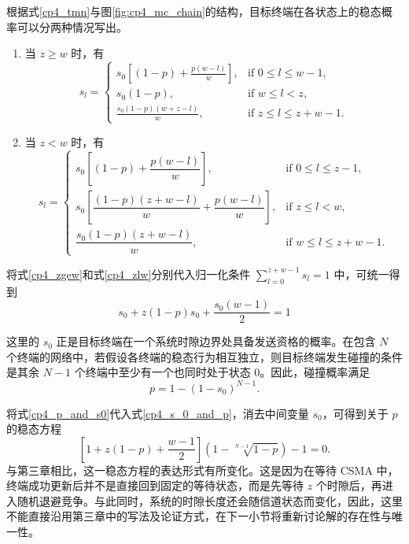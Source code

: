 根据式\eqref{cp4_tmn}与图\ref{fig:cp4_mc_chain}的结构，目标终端在各状态上的稳态概率可以分两种情况写出。
\begin{enumerate}[wide]
    \item 当 $z\ge w$ 时，有
    \begin{equation}\label{cp4_zgew}
        s_l =
\begin{cases}
s_0 \left[ (1 - p) + \frac{p(w-l)}{w} \right], & \text{if } 0 \le l \le w - 1, \\
s_0 (1 - p), & \text{if } w \le l < z, \\
\frac{s_0 (1-p)(w+z-l)}{w}, & \text{if } z \le l \le z + w - 1.
\end{cases}
    \end{equation}

    \item 当 $z<w$ 时，有
    \begin{equation}\label{cp4_zlw}
        s_l =
\begin{cases}
s_0 \left[ (1 - p) + \dfrac{p(w-l)}{w} \right], & \text{if } 0 \le l \le z - 1, \\
s_0 \left[ \dfrac{(1-p)(z+w-l)}{w} + \dfrac{p(w-l)}{w} \right], & \text{if } z \le l < w, \\
\dfrac{s_0 (1-p)(z+w-l)}{w}, & \text{if } w \le l \le z + w - 1.
\end{cases}
    \end{equation}
\end{enumerate}

将式\eqref{cp4_zgew}和式\eqref{cp4_zlw}分别代入归一化条件 $\sum_{l=0}^{z+w-1}s_l=1$ 中，可统一得到
\begin{equation}\label{cp4_s_0_and_p}
    s_0+z(1-p)s_0+\frac{s_0(w-1)}{2}=1
\end{equation}

这里的 $s_0$ 正是目标终端在一个系统时隙边界处具备发送资格的概率。在包含 $N$ 个终端的网络中，若假设各终端的稳态行为相互独立，则目标终端发生碰撞的条件是其余 $N-1$ 个终端中至少有一个也同时处于状态 0。因此，碰撞概率满足
\begin{equation}\label{cp4_p_and_s0}
    p=1-(1-s_0)^{N-1}.
\end{equation}

将式\eqref{cp4_p_and_s0}代入式\eqref{cp4_s_0_and_p}，消去中间变量 $s_0$，可得到关于 $p$ 的稳态方程
\begin{equation}\label{cp4_ziqiafangcheng_p}
    \left[ 1 + z(1-p) + \frac{w-1}{2} \right] \left( 1 -\sqrt[N -1]{1-p} \right) - 1=0.
\end{equation}
与第三章相比，这一稳态方程的表达形式有所变化。这是因为在等待 CSMA 中，终端成功更新后并不是直接回到固定的等待状态，而是先等待 $z$ 个时隙后，再进入随机退避竞争。与此同时，系统的时隙长度还会随信道状态而变化，因此，这里不能直接沿用第三章中的写法及论证方式，在下一小节将重新讨论解的存在性与唯一性。

